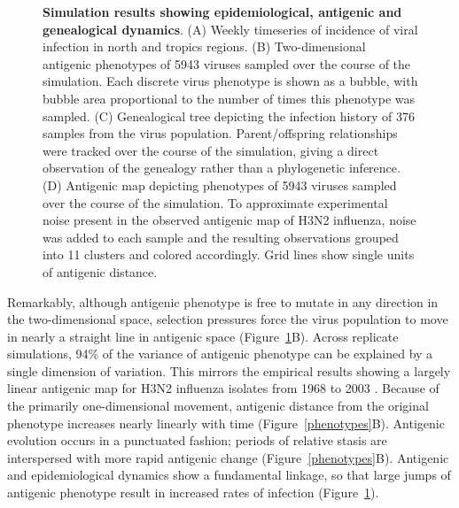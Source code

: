 \documentclass[11pt,oneside,letterpaper]{article}
\begin{document}
\begin{figure}[tb]
	\centering
	\caption{\textbf{Simulation results showing epidemiological, antigenic and genealogical dynamics}. (A) Weekly timeseries of incidence of viral infection in north and tropics regions.  (B) Two-dimensional antigenic phenotypes of 5943 viruses sampled over the course of the simulation. Each discrete virus phenotype is shown as a bubble, with bubble area proportional to the number of times this phenotype was sampled.  (C) Genealogical tree depicting the infection history of 376 samples from the virus population.  Parent/offspring relationships were tracked over the course of the simulation, giving a direct observation of the genealogy rather than a phylogenetic inference.  (D) Antigenic map depicting phenotypes of 5943 viruses sampled over the course of the simulation.  To approximate experimental noise present in the observed antigenic map of H3N2 influenza, noise was added to each sample and the resulting observations grouped into 11 clusters and colored accordingly.  Grid lines show single units of antigenic distance.}
	\label{evol}
\end{figure}

Remarkably, although antigenic phenotype is free to mutate in any direction in the two-dimensional space, selection pressures force the virus population to move in nearly a straight line in antigenic space (Figure~\ref{evol}B).  Across replicate simulations, 94\% of the variance of antigenic phenotype can be explained by a single dimension of variation.  This mirrors the empirical results showing a largely linear antigenic map for H3N2 influenza isolates from 1968 to 2003 \cite{Smith04}.  Because of the primarily one-dimensional movement, antigenic distance from the original phenotype increases nearly linearly with time (Figure~\ref{phenotypes}B).  Antigenic evolution occurs in a punctuated fashion; periods of relative stasis are interspersed with more rapid antigenic change (Figure~\ref{phenotypes}B).  Antigenic and epidemiological dynamics show a fundamental linkage, so that large jumps of antigenic phenotype result in increased rates of infection (Figure~\ref{evol}).  
\end{document}
